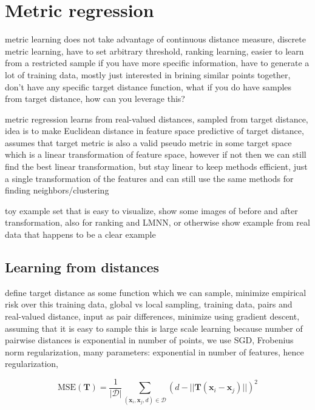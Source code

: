 \documentclass[a4paper,titlepage]{article}
\renewcommand{\vec}[1]{\mathbf{#1}}
\newcommand{\mat}[1]{\mathbf{#1}}
\begin{document}
\pagebreak
\section{Metric regression}
\label{metric_regression}

metric learning does not take advantage of continuous distance measure, discrete metric learning, have to set arbitrary threshold, ranking learning, easier to learn from a restricted sample if you have more specific information, have to generate a lot of training data, mostly just interested in brining similar points together, don't have any specific target distance function, what if you do have samples from target distance, how can you leverage this? 

metric regression learns from real-valued distances, sampled from target distance, idea is to make Euclidean distance in feature space predictive of target distance, assumes that target metric is also a valid pseudo metric in some target space which is a linear transformation of feature space, however if not then we can still find the best linear transformation, but stay linear to keep methods efficient, just a single transformation of the features and can still use the same methods for finding neighbors/clustering

toy example set that is easy to visualize, show some images of before and after transformation, also for ranking and LMNN, or otherwise show example from real data that happens to be a clear example


\subsection{Learning from distances}

define target distance as some function which we can sample, minimize empirical risk over this training data, global vs local sampling, training data, pairs and real-valued distance, input as pair differences, minimize using gradient descent, assuming that it is easy to sample this is large scale learning because number of pairwise distances is exponential in number of points, we use SGD, Frobenius norm regularization, many parameters: exponential in number of features, hence regularization, 


\begin{equation}
\text{MSE}(\mat{T}) = \frac{1}{|\mathcal{D}|}\sum_{(\vec{x}_i, \vec{x}_j, d) \in \mathcal{D}} \left ( d - ||\mat{T} (\vec{x}_i - \vec{x}_j)|| \right)^2
\label{eq:mse}
\end{equation}
\end{document}
